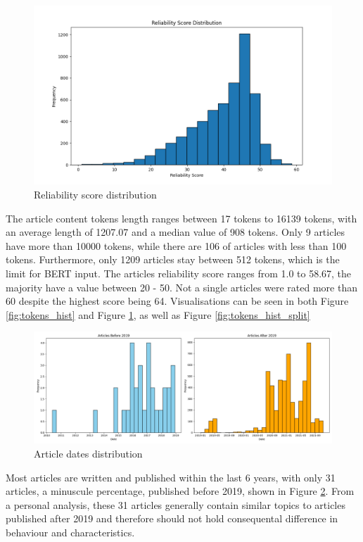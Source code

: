 \begin{figure}[htbp]
    \centering
    \includegraphics[width=0.9\linewidth]{figures/reliability_score_hist.png}
    \caption{Reliability score distribution}
    \label{fig:reliability_score_hist}
\end{figure}

The article content tokens length ranges between 17 tokens to 16139 tokens, with an average length of 1207.07 and a median value of 908 tokens. Only 9 articles have more than 10000 tokens, while there are 106 of articles with less than 100 tokens. Furthermore, only 1209 articles stay between 512 tokens, which is the limit for BERT input. The articles reliability score ranges from 1.0 to 58.67, the majority have a value between 20 - 50. Not a single articles were rated more than 60 despite the highest score being 64. Visualisations can be seen in both Figure \ref{fig:tokens_hist} and Figure \ref{fig:reliability_score_hist}, as well as Figure \ref{fig:tokens_hist_split}


\begin{figure}[htbp]
    \includegraphics[width=0.9\linewidth]{figures/dates_hist.png}
    \caption{Article dates distribution}
    \label{fig:dates_hist}
\end{figure}

Most articles are written and published within the last 6 years, with only 31 articles, a minuscule percentage, published before 2019, shown in Figure \ref{fig:dates_hist}. From a personal analysis, these 31 articles generally contain similar topics to articles published after 2019 and therefore should not hold consequental difference in behaviour and characteristics.


